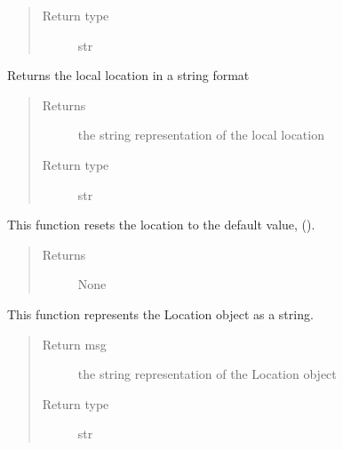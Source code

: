 \documentclass[letterpaper,10pt,english]{sphinxmanual}
\begin{document}
\begin{fulllineitems}
\begin{fulllineitems}
\begin{quote}
\begin{description}
\item[{Return type}] \leavevmode
str

\end{description}\end{quote}

\end{fulllineitems}


\begin{fulllineitems}
\label{location:location.Location.print_local}
Returns the local location in a string format
\begin{quote}\begin{description}
\item[{Returns}] \leavevmode
the string representation of the local location

\item[{Return type}] \leavevmode
str

\end{description}\end{quote}

\end{fulllineitems}


\begin{fulllineitems}
\label{location:location.Location.reset}
This function resets the location to the default value, ().
\begin{quote}\begin{description}
\item[{Returns}] \leavevmode
None

\end{description}\end{quote}

\end{fulllineitems}


\begin{fulllineitems}
\label{location:location.Location.toString}
This function represents the Location object as a string.
\begin{quote}\begin{description}
\item[{Return msg}] \leavevmode
the string representation of the Location object

\item[{Return type}] \leavevmode
str

\end{description}\end{quote}

\end{fulllineitems}


\end{fulllineitems}
\end{document}
